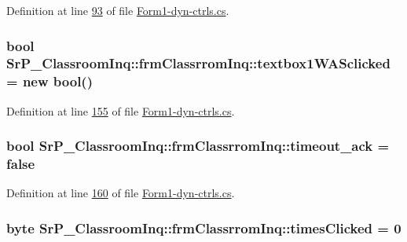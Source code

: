 \-Definition at line \hyperlink{_form1-dyn-ctrls_8cs_source_l00093}{93} of file \hyperlink{_form1-dyn-ctrls_8cs_source}{\-Form1-\/dyn-\/ctrls.\-cs}.

\hypertarget{class_sr_p___classroom_inq_1_1frm_classrrom_inq_a998e499144884577e3445f4b721b4c6a}{
\subsubsection[{textbox1\-W\-A\-Sclicked}]{\setlength{\rightskip}{0pt plus 5cm}bool {\bf \-Sr\-P\-\_\-\-Classroom\-Inq\-::frm\-Classrrom\-Inq\-::textbox1\-W\-A\-Sclicked} = new bool()}}
\label{class_sr_p___classroom_inq_1_1frm_classrrom_inq_a998e499144884577e3445f4b721b4c6a}


\-Definition at line \hyperlink{_form1-dyn-ctrls_8cs_source_l00155}{155} of file \hyperlink{_form1-dyn-ctrls_8cs_source}{\-Form1-\/dyn-\/ctrls.\-cs}.

\hypertarget{class_sr_p___classroom_inq_1_1frm_classrrom_inq_a64cde7d8ac96b5122de783724c58103a}{
\subsubsection[{timeout\-\_\-ack}]{\setlength{\rightskip}{0pt plus 5cm}bool {\bf \-Sr\-P\-\_\-\-Classroom\-Inq\-::frm\-Classrrom\-Inq\-::timeout\-\_\-ack} = false}}
\label{class_sr_p___classroom_inq_1_1frm_classrrom_inq_a64cde7d8ac96b5122de783724c58103a}


\-Definition at line \hyperlink{_form1-dyn-ctrls_8cs_source_l00160}{160} of file \hyperlink{_form1-dyn-ctrls_8cs_source}{\-Form1-\/dyn-\/ctrls.\-cs}.

\hypertarget{class_sr_p___classroom_inq_1_1frm_classrrom_inq_a8b01f872cc35c75e41502f5114a65b74}{
\subsubsection[{times\-Clicked}]{\setlength{\rightskip}{0pt plus 5cm}byte {\bf \-Sr\-P\-\_\-\-Classroom\-Inq\-::frm\-Classrrom\-Inq\-::times\-Clicked} = 0}}
\label{class_sr_p___classroom_inq_1_1frm_classrrom_inq_a8b01f872cc35c75e41502f5114a65b74}


